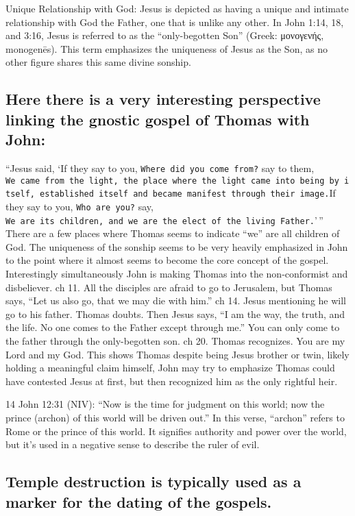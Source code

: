 Unique Relationship with God: Jesus is depicted as having a unique and intimate relationship with God the Father, one that is unlike any other.
In John 1:14, 18, and 3:16, Jesus is referred to as the ``only-begotten Son'' (Greek: μονογενής, monogenēs).
This term emphasizes the uniqueness of Jesus as the Son, as no other figure shares this same divine sonship.

\subsection{Here there is a very interesting perspective linking the gnostic gospel of Thomas with John:}\label{subsec:here-there-is-a-very-interesting-perspective-linking-the-gnostic-gospel-of-thomas-with-john}

``Jesus said, `If they say to you, \texttt{Where\ did\ you\ come\ from?} say to them, \texttt{We\ came\ from\ the\ light,\ the\ place\ where\ the\ light\ came\ into\ being\ by\ itself,\ established\ itself\ and\ became\ manifest\ through\ their\ image.}If they say to you, \texttt{Who\ are\ you?} say, \texttt{We\ are\ its\ children,\ and\ we\ are\ the\ elect\ of\ the\ living\ Father.}'\,'' There are a few places where Thomas seems to indicate ``we'' are all children of God.
The uniqueness of the sonship seems to be very heavily emphasized in John to the point where it almost seems to become the core concept of the gospel.
Interestingly simultaneously John is making Thomas into the non-conformist and disbeliever.
ch 11.
All the disciples are afraid to go to Jerusalem, but Thomas says, ``Let us also go, that we may die with him.'' ch 14.
Jesus mentioning he will go to his father.
Thomas doubts.
Then Jesus says, ``I am the way, the truth, and the life.
No one comes to the Father except through me.'' You can only come to the father through the only-begotten son.
ch 20.
Thomas recognizes.
You are my Lord and my God.
This shows Thomas despite being Jesus brother or twin, likely holding a meaningful claim himself, John may try to emphasize Thomas could have contested Jesus at first, but then recognized him as the only rightful heir.

14 John 12:31 (NIV): ``Now is the time for judgment on this world; now the prince (archon) of this world will be driven out.'' In this verse, ``archon'' refers to Rome or the prince of this world.
It signifies authority and power over the world, but it's used in a negative sense to describe the ruler of evil.

\subsection{Temple destruction is typically used as a marker for the dating of the gospels.}\label{subsec:temple-destruction-is-typically-used-as-a-marker-for-the-dating-of-the-gospels.}

